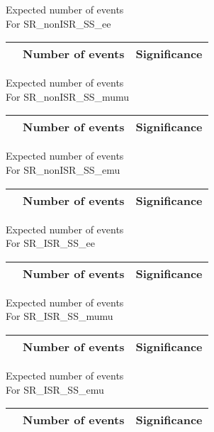 \begin{frame}{Expected number of events \\ For SR\_nonISR\_SS\_ee}
\vspace{5mm}
\begin{tabular}{|c|c|c|}
\hline
& Number of events & Significance \\
\hline

\end{tabular}
\end{frame}

\begin{frame}{Expected number of events \\ For SR\_nonISR\_SS\_mumu}
\vspace{5mm}
\begin{tabular}{|c|c|c|}
\hline
& Number of events & Significance \\
\hline

\end{tabular}
\end{frame}

\begin{frame}{Expected number of events \\ For SR\_nonISR\_SS\_emu}
\vspace{5mm}
\begin{tabular}{|c|c|c|}
\hline
& Number of events & Significance \\
\hline

\end{tabular}
\end{frame}

\begin{frame}{Expected number of events \\ For SR\_ISR\_SS\_ee}
\vspace{5mm}
\begin{tabular}{|c|c|c|}
\hline
& Number of events & Significance \\
\hline

\end{tabular}
\end{frame}

\begin{frame}{Expected number of events \\ For SR\_ISR\_SS\_mumu}
\vspace{5mm}
\begin{tabular}{|c|c|c|}
\hline
& Number of events & Significance \\
\hline

\end{tabular}
\end{frame}

\begin{frame}{Expected number of events \\ For SR\_ISR\_SS\_emu}
\vspace{5mm}
\begin{tabular}{|c|c|c|}
\hline
& Number of events & Significance \\
\hline

\end{tabular}
\end{frame}

